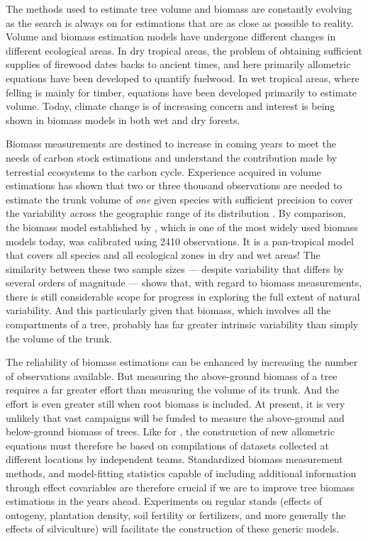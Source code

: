 
The methods used to estimate tree volume and biomass are constantly evolving as the search is always on for estimations that are as close as possible to reality. Volume and biomass estimation models have undergone different changes in different ecological areas. In dry tropical areas, the problem of obtaining sufficient supplies of firewood dates backs to ancient times, and here primarily allometric equations have been developed to quantify fuelwood. In wet tropical areas, where felling is mainly for timber, equations have been developed primarily to estimate volume. Today, climate change is of increasing concern and interest is being shown in biomass models in both wet and dry forests.

Biomass measurements are destined to increase in coming years to meet the needs of carbon stock estimations and understand the contribution made by terrestial ecosystems to the carbon cycle. Experience acquired in volume estimations has shown that two or three thousand observations are needed to estimate the trunk volume of \emph{one} given species with sufficient precision to cover the variability across  the geographic range of its distribution \citep{ctft89}. By comparison, the biomass model established by \citet{chave05}, which is one of the most widely used biomass models today, was calibrated using 2410 observations. It is a pan-tropical model that covers all species and all ecological zones in dry and wet areas! The similarity between these two sample sizes --- despite variability that differs by several orders of magnitude --- shows that, with regard to biomass measurements, there is still considerable scope for progress in exploring the full extent of natural variability. And this particularly given that biomass, which involves all the compartments of a tree, probably has far greater intrinsic variability than simply the volume of the trunk.

The reliability of biomass estimations can be enhanced by increasing the number of observations available. But measuring the above-ground biomass of a tree requires a far greater effort than measuring the volume of its trunk. And the effort is even greater still when root biomass is included. At present, it is very unlikely that vast campaigns will be funded to measure the above-ground and below-ground biomass of trees. Like for \citet{chave05}, the construction of new allometric equations must therefore be based on compilations of datasets collected at different locations by independent teams. Standardized biomass measurement methods, and model-fitting statistics capable of including additional information through effect covariables are therefore crucial if we are to improve tree biomass estimations in the years ahead. Experiments on regular stands (effects of ontogeny, plantation density, soil fertility or fertilizers, and more generally the effects of silviculture) will facilitate the construction of these generic models.

